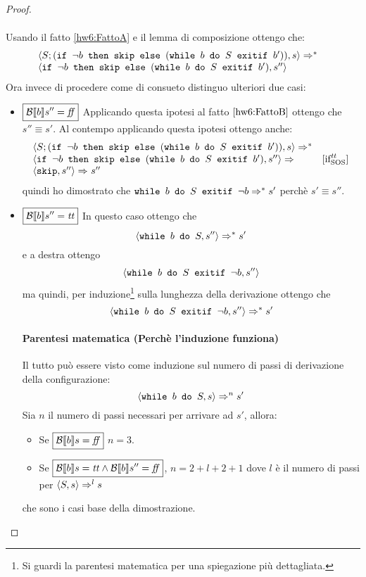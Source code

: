 {\begin{enumerate}
\begin{proof}
\begin{itemize}
$$\begin{array}{ll}
\end{array}
$$
Usando il fatto \ref{hw6:FattoA}  e il lemma di composizione ottengo che:
$$
\begin{array}{ll}
\confSs{S; (\ifABC{\neg b}{\skipForFriends}{(\wbSE{b}{S}{b'})})}{s} \Rar{*} & \\
\confSs{\ifABC{\neg b}{\skipForFriends}{(\wbSE{b}{S}{b'})}}{s''}
\end{array}
$$
Ora invece di procedere come di consueto distinguo ulteriori due casi:
\begin{itemize}
\item $\boxed{\B{b}'' = \semfalse}$
Applicando questa ipotesi al fatto $\ref{hw6:FattoB}$ ottengo che $\boxed{s'' \equiv s'}$.
Al contempo applicando questa ipotesi ottengo anche:
$$
\begin{array}{ll}
	\confSs{S; (\ifABC{\neg b}{\skipForFriends}{(\wbSE{b}{S}{b'})})}{s} \Rar{*} & \\
	\confSs{\ifABC{\neg b}{\skipForFriends}{(\wbSE{b}{S}{b'})}}{s''} \Rar{} & \ifttSOS \\
	\confSs{\skipForFriends}{s''} \Rar{ } s'' & \\
\end{array}
$$
quindi ho dimostrato che $\wbSE{b}{S}{\neg b} \Rar{*} s'$ perchè $s' \equiv s''$.
\item $\boxed{\B{b}'' = \semtrue}$	
In questo caso ottengo che
$$
\confSs{\wbS{b}{S}}{s''} \Rar{*} s'
$$
e a destra ottengo
$$
\confSs{\wbSE{b}{S}{\neg b}}{s''}
$$
ma quindi, per induzione\footnote{Si guardi la parentesi matematica per una
spiegazione più dettagliata.} sulla lunghezza della derivazione ottengo che
$$
\confSs{\wbSE{b}{S}{\neg b}}{s''} \Rar{*} s'
$$
\paragraph{Parentesi matematica (Perchè l'induzione funziona)}

Il tutto può essere visto come induzione sul numero di passi di derivazione
della configurazione: $$\confSs{\wbS{b}{S}}{s} \Rar{n} s'$$
Sia $n$ il numero di passi necessari per arrivare ad $s'$, allora:
\begin{itemize}
\item Se $\boxed{\B{b} = \semfalse}$ $n = 3$.
\item Se $\boxed{\B{b} = \semtrue \land \B{b}'' = \semfalse}$, $n = 2 + l + 2 + 1$ dove $l$ è il numero
di passi per $\confSs{S}{s} \Rar{l} s$
\end{itemize}
che sono i casi base della dimostrazione.


\end{itemize}
\end{itemize}
\end{proof}
\end{enumerate}}
